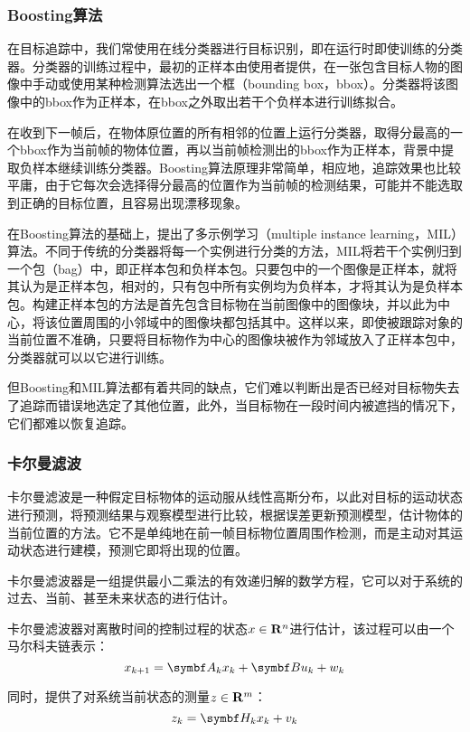 \subsubsection{Boosting算法}
  在目标追踪中，我们常使用在线分类器进行目标识别，即在运行时即使训练的分类器。分类器的训练过程中，最初的正样本由使用者提供，在一张包含目标人物的图像中手动或使用某种检测算法选出一个框（bounding box，bbox）。分类器将该图像中的bbox作为正样本，在bbox之外取出若干个负样本进行训练拟合。

  在收到下一帧后，在物体原位置的所有相邻的位置上运行分类器，取得分最高的一个bbox作为当前帧的物体位置，再以当前帧检测出的bbox作为正样本，背景中提取负样本继续训练分类器。Boosting算法原理非常简单，相应地，追踪效果也比较平庸，由于它每次会选择得分最高的位置作为当前帧的检测结果，可能并不能选取到正确的目标位置，且容易出现漂移现象。

  在Boosting算法的基础上，\citet{babenko2009visual}提出了多示例学习（multiple instance learning，MIL）算法。不同于传统的分类器将每一个实例进行分类的方法，MIL将若干个实例归到一个包（bag）中，即正样本包和负样本包。只要包中的一个图像是正样本，就将其认为是正样本包，相对的，只有包中所有实例均为负样本，才将其认为是负样本包。构建正样本包的方法是首先包含目标物在当前图像中的图像块，并以此为中心，将该位置周围的小邻域中的图像块都包括其中。这样以来，即使被跟踪对象的当前位置不准确，只要将目标物作为中心的图像块被作为邻域放入了正样本包中，分类器就可以以它进行训练。

  但Boosting和MIL算法都有着共同的缺点，它们难以判断出是否已经对目标物失去了追踪而错误地选定了其他位置，此外，当目标物在一段时间内被遮挡的情况下，它们都难以恢复追踪。

\subsubsection{卡尔曼滤波}

  卡尔曼滤波是一种假定目标物体的运动服从线性高斯分布，以此对目标的运动状态进行预测，将预测结果与观察模型进行比较，根据误差更新预测模型，估计物体的当前位置的方法。它不是单纯地在前一帧目标物位置周围作检测，而是主动对其运动状态进行建模，预测它即将出现的位置。
  
  卡尔曼滤波器是一组提供最小二乘法的有效递归解的数学方程，它可以对于系统的过去、当前、甚至未来状态的进行估计\cite{welch1995introduction}。

  卡尔曼滤波器对离散时间的控制过程的状态$x\in \mathbf{R}^n$进行估计，该过程可以由一个马尔科夫链表示：
$$x_{k+1}=\mat{A}_k x_k + \mat{B} u_k + w_k$$

  同时，提供了对系统当前状态的测量$z\in \mathbf{R}^m$：
$$z_k=\mat{H}_k x_k + v_k$$

